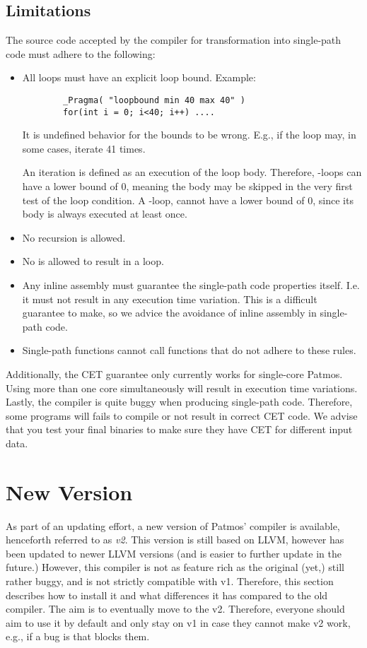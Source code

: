 \subsection{Limitations}

The source code accepted by the compiler for transformation into single-path code must adhere to the following:

\begin{itemize}
	\item All loops must have an explicit loop bound. Example:
	\begin{verbatim}
		_Pragma( "loopbound min 40 max 40" )
		for(int i = 0; i<40; i++) ....
	\end{verbatim}
	It is undefined behavior for the bounds to be wrong.
	E.g., if the loop may, in some cases, iterate 41 times.
	
	An iteration is defined as an execution of the loop body.
	Therefore, -loops can have a lower bound of 0, meaning the body may be skipped in the very first test of the loop condition.
	A -loop, cannot have a lower bound of 0, since its body is always executed at least once.
	
	\item No recursion is allowed.
	\item No  is allowed to result in a loop.
	\item Any inline assembly must guarantee the single-path code properties itself. I.e. it must not result in any execution time variation.
	This is a difficult guarantee to make, so we advice the avoidance of inline assembly in single-path code.
	\item Single-path functions cannot call functions that do not adhere to these rules.
\end{itemize}

Additionally, the CET guarantee only currently works for single-core Patmos. Using more than one core simultaneously will result in execution time variations.
Lastly, the compiler is quite buggy when producing single-path code.
Therefore, some programs will fails to compile or not result in correct CET code.
We advise that you test your final binaries to make sure they have CET for different input data.

\section{New Version}

As part of an updating effort, a new version of Patmos' compiler is available, henceforth referred to as \textit{v2}.
This version is still based on LLVM, however has been updated to newer LLVM versions (and is easier to further update in the future.)
However, this compiler is not as feature rich as the original (yet,) still rather buggy, and is not strictly compatible with v1.
Therefore, this section describes how to install it and what differences it has compared to the old compiler.
The aim is to eventually move to the v2.
Therefore, everyone should aim to use it by default and only stay on v1 in case they cannot make v2 work, e.g., if a bug is that blocks them.

